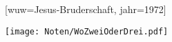 [wuw={Jesus-Bruderschaft}, jahr=1972]

\beginverse
\endverse
\centering\texttt{[image: Noten/WoZweiOderDrei.pdf]}


\endsong
\beginscripture{}
\endscripture

\begin{intersong}

\end{intersong}